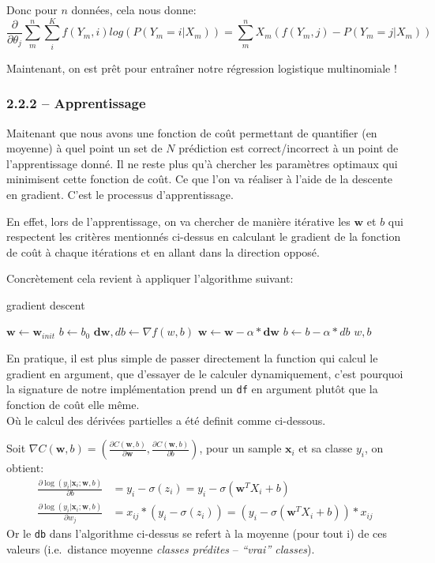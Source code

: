 \documentclass[
]{article}
\begin{document}
Donc pour \(n\) données, cela nous donne:
\[\frac{\partial}{\partial \theta_{j}} \sum_m^n \sum_i^K f(Y_m, i)log(P(Y_m = i | X_m)) = \sum_m^n X_m(f(Y_m, j) - P(Y_m = j|X_m))\]

Maintenant, on est prêt pour entraîner notre régression logistique
multinomiale !

\hypertarget{apprentissage}{%
\subsubsection{2.2.2 -- Apprentissage}\label{apprentissage}}

Maitenant que nous avons une fonction de coût permettant de quantifier
(en moyenne) à quel point un set de \(N\) prédiction est
correct/incorrect à un point de l'apprentissage donné. Il ne reste plus
qu'à chercher les paramètres optimaux qui minimisent cette fonction de
coût. Ce que l'on va réaliser à l'aide de la descente en gradient. C'est
le processus d'apprentissage.

En effet, lors de l'apprentissage, on va chercher de manière itérative
les \(\mathbf{w}\) et \(b\) qui respectent les critères mentionnés
ci-dessus en calculant le gradient de la fonction de coût à chaque
itérations et en allant dans la direction opposé.

Concrètement cela revient à appliquer l'algorithme suivant:

\begin{algorithm}
\caption{gradient descent}\label{alg:grad_desc}
\begin{algorithmic}
\State $\mathbf{w}\gets \mathbf{w}_{init}$
\State $b \gets b_0$
    \State $\mathbf{dw}, db \gets \nabla{f(w, b)} $
    \State $\mathbf{w}\gets \mathbf{w}- \alpha*\mathbf{dw}$
    \State $b \gets b - \alpha*db$
\EndFor
\State \Return $w, b$
\EndFunction
\end{algorithmic}
\end{algorithm}

En pratique, il est plus simple de passer directement la function qui
calcul le gradient en argument, que d'essayer de le calculer
dynamiquement, c'est pourquoi la signature de notre implémentation prend
un \texttt{df} en argument plutôt que la fonction de coût elle même.\\
Où le calcul des dérivées partielles a été definit comme ci-dessous.

Soit
\(\nabla C(\mathbf{w},b) = (\frac{\partial C(\mathbf{w},b)}{\partial \mathbf{w}}, \frac{\partial C(\mathbf{w},b)}{\partial b} )\),
pour un sample \(\mathbf{x}_i\) et sa classe \(y_i\), on obtient:
\begin{align*}
\frac{\partial \log(y_i|\mathbf{x}_i ; \mathbf{w}, b)}{\partial b} 
&= y_i - \sigma(z_i) 
= y_i - \sigma(\mathbf{w}^T X_i + b)\\
%
\frac{\partial \log(y_i|\mathbf{x}_i ; \mathbf{w}, b)}{\partial w_j} 
&= x_{ij}* ( y_i - \sigma(z_i)) 
= (y_i - \sigma(\mathbf{w}^T X_i + b)) * x_{ij}
\end{align*} Or le \texttt{db} dans l'algorithme ci-dessus se refert à
la moyenne (pour tout i) de ces valeurs (i.e.~distance moyenne
\emph{classes prédites} -- \emph{``vrai'' classes}).
\end{document}
